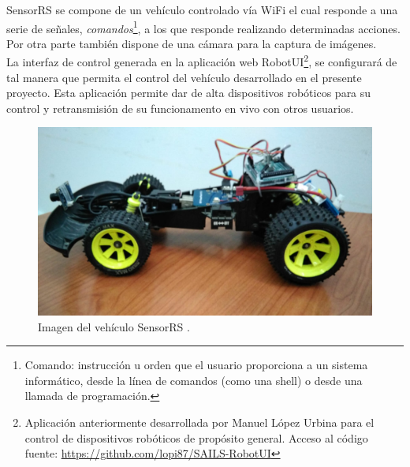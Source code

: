 SensorRS se compone de un vehículo controlado vía WiFi el cual responde a una serie de señales, \emph{comandos}\footnote{ Comando: instrucción u orden que el usuario proporciona a un sistema informático, 
desde la línea de comandos (como una shell) o desde una llamada de programación.}, a los que responde realizando determinadas acciones. Por otra parte también dispone de una cámara para la captura de imágenes.\\

La interfaz de control generada en la aplicación web RobotUI\footnote{ Aplicación anteriormente desarrollada por Manuel López Urbina para el control de dispositivos robóticos de propósito general. Acceso al 
código fuente: \url{https://github.com/lopi87/SAILS-RobotUI}}, se configurará de tal manera que permita el control del vehículo desarrollado en el presente proyecto. 
Esta aplicación permite dar de alta dispositivos robóticos para su control y retransmisión de su funcionamento en vivo con otros usuarios.\\

\begin{figure}[H]
  \begin{center}
    \includegraphics[scale=0.3]{imagenes/rc_car.jpeg}
  \end{center}
  \label{fig:logo}
 \caption{Imagen del vehículo SensorRS \protect\footnotemark.}
\end{figure}


